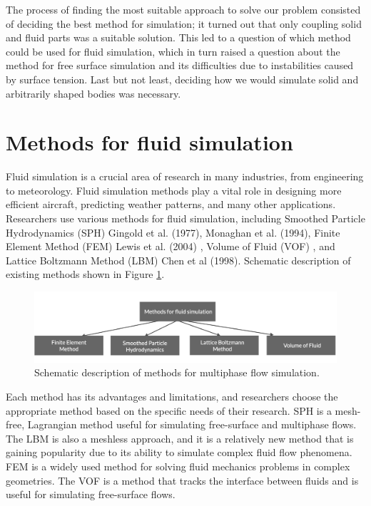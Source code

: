 The process of finding the most suitable approach to solve our problem consisted of deciding the best method for simulation; it turned out that only coupling solid and fluid parts was a suitable solution. This led to a question of which method could be used for fluid simulation, which in turn raised a question about the method for free surface simulation and its difficulties due to instabilities caused by surface tension. Last but not least, deciding how we would simulate solid and arbitrarily shaped bodies was necessary.

\section{Methods for fluid simulation}

Fluid simulation is a crucial area of research in many industries, from engineering to meteorology. Fluid simulation methods play a vital role in designing more efficient aircraft, predicting weather patterns, and many other applications. Researchers use various methods for fluid simulation, including Smoothed Particle Hydrodynamics (\ac{SPH}) Gingold et al. (1977), Monaghan et al. (1994)\cite{gingold1977SPH, monaghan1994SPH}, Finite Element Method (\ac{FEM}) Lewis et al. (2004) \cite{lewis2004fundamentals}, Volume of Fluid (\ac{VOF}) \cite{hirt1981volume}, and Lattice Boltzmann Method (\ac{LBM}) Chen et al (1998)\cite{chen1998lattice}. Schematic description of existing methods shown in Figure \ref{fig:methods_for_fluids}.
\begin{figure}[!ht]
    \centering
    \includegraphics[width=15cm]{Images/chap1/methods_for_fluids.png}
    \caption{Schematic description of methods for multiphase flow simulation.}
    \label{fig:methods_for_fluids}
\end{figure}
Each method has its advantages and limitations, and researchers choose the appropriate method based on the specific needs of their research. SPH is a mesh-free, Lagrangian method useful for simulating free-surface and multiphase flows. The LBM is also a meshless approach, and it is a relatively new method that is gaining popularity due to its ability to simulate complex fluid flow phenomena. FEM is a widely used method for solving fluid mechanics problems in complex geometries. The VOF is a method that tracks the interface between fluids and is useful for simulating free-surface flows.

